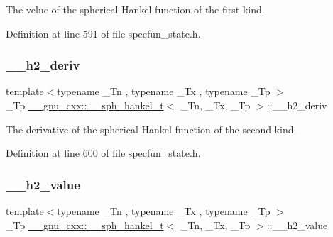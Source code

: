 The velue of the spherical Hankel function of the first kind. 



Definition at line 591 of file specfun\+\_\+state.\+h.

\mbox{\label{struct____gnu__cxx_1_1____sph__hankel__t_a7b6cbd23f269cf3b0c76d1fc21bede4d}} 
\subsubsection{\texorpdfstring{\+\_\+\+\_\+h2\+\_\+deriv}{\_\_h2\_deriv}}
{\footnotesize\ttfamily template$<$typename \+\_\+\+Tn , typename \+\_\+\+Tx , typename \+\_\+\+Tp $>$ \\
\+\_\+\+Tp \hyperlink{struct____gnu__cxx_1_1____sph__hankel__t}{\+\_\+\+\_\+gnu\+\_\+cxx\+::\+\_\+\+\_\+sph\+\_\+hankel\+\_\+t}$<$ \+\_\+\+Tn, \+\_\+\+Tx, \+\_\+\+Tp $>$\+::\+\_\+\+\_\+h2\+\_\+deriv}



The derivative of the spherical Hankel function of the second kind. 



Definition at line 600 of file specfun\+\_\+state.\+h.

\mbox{\label{struct____gnu__cxx_1_1____sph__hankel__t_a225e48ba2faafbdabd65cd173372d418}} 
\subsubsection{\texorpdfstring{\+\_\+\+\_\+h2\+\_\+value}{\_\_h2\_value}}
{\footnotesize\ttfamily template$<$typename \+\_\+\+Tn , typename \+\_\+\+Tx , typename \+\_\+\+Tp $>$ \\
\+\_\+\+Tp \hyperlink{struct____gnu__cxx_1_1____sph__hankel__t}{\+\_\+\+\_\+gnu\+\_\+cxx\+::\+\_\+\+\_\+sph\+\_\+hankel\+\_\+t}$<$ \+\_\+\+Tn, \+\_\+\+Tx, \+\_\+\+Tp $>$\+::\+\_\+\+\_\+h2\+\_\+value}




